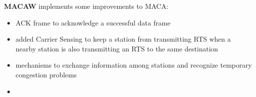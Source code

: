\nl

\textbf{MACAW} implements some improvements to MACA:
\begin{itemize}
   \item ACK frame to acknowledge a
   successful data frame
   \item added Carrier Sensing to keep a station from
   transmitting RTS when a nearby station is also
   transmitting an RTS to the same destination
   \item mechanisms to exchange information among
   stations and recognize temporary congestion
   problems
   \item[] 
\end{itemize}